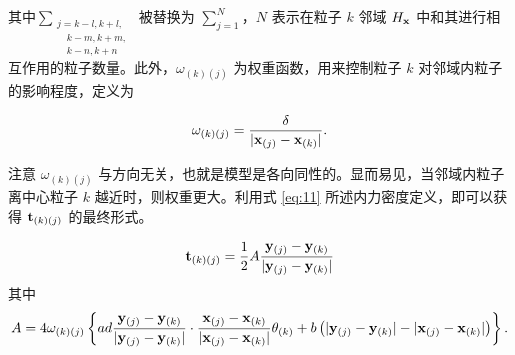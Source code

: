 {{其中$\sum_{\substack {j=k-l,k+l,\\ \quad k-m,k+m,\\ \quad k-n,k+n}}$ 被替换为 $\sum_{j=1}^{N}$，$N$ 表示在粒子 $k$ 邻域 $H_{\mathbf{x}}$ 中和其进行相互作用的粒子数量。此外，$\omega_{(k)(j)}$ 为权重函数，用来控制粒子 $k$ 对邻域内粒子的影响程度，定义为

\begin{equation}
\omega_{(k)(j)} = \frac{\delta}{|\mathbf{x}_{(j)}-\mathbf{x}_{(k)}|}.
\label{eq:28}
\end{equation}

注意 $\omega_{(k)(j)}$ 与方向无关，也就是模型是各向同性的。显而易见，当邻域内粒子离中心粒子 $k$ 越近时，则权重更大。利用式 \ref{eq:11} 所述内力密度定义，即可以获得 $\mathbf{t}_{(k)(j)}$ 的最终形式。

\begin{equation}
\mathbf{t}_{(k)(j)} = \frac{1}{2}A\frac{\mathbf{y}_{(j)} - \mathbf{y}_{(k)}}{|\mathbf{y}_{(j)} - \mathbf{y}_{(k)}|}
\label{eq:29}
\end{equation}
其中
\begin{equation}
A = 4\omega_{(k)(j)}\left\{ad\frac{\mathbf{y}_{(j)} - \mathbf{y}_{(k)}}{|\mathbf{y}_{(j)} - \mathbf{y}_{(k)}|}\cdot\frac{\mathbf{x}_{(j)} - \mathbf{x}_{(k)}}{|\mathbf{x}_{(j)} - \mathbf{x}_{(k)}|}\theta_{(k)}
   +b\left(|\mathbf{y}_{(j)} - \mathbf{y}_{(k)}| - |\mathbf{x}_{(j)} - \mathbf{x}_{(k)}|\right) \right\}.
\label{eq:30}
\end{equation}

}}
